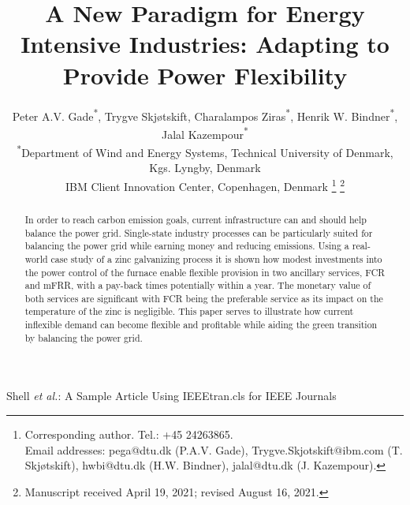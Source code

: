 \documentclass[lettersize,journal]{IEEEtran}
\begin{document}
\title{A New Paradigm for Energy Intensive Industries: Adapting to Provide Power Flexibility}

\author{Peter A.V. Gade\textsuperscript{*}\textsuperscript{\textdagger}, Trygve Skjøtskift\textsuperscript{\textdagger}, Charalampos Ziras\textsuperscript{*}, Henrik W. Bindner\textsuperscript{*}, Jalal Kazempour\textsuperscript{*} \\
    \textsuperscript{*}Department of Wind and Energy Systems, Technical University of Denmark, Kgs. Lyngby, Denmark \\
    \textsuperscript{\textdagger}IBM Client Innovation Center, Copenhagen, Denmark
    \thanks{Corresponding author. Tel.: +45 24263865. \\ Email addresses: pega@dtu.dk (P.A.V. Gade), Trygve.Skjotskift@ibm.com (T. Skjøtskift), hwbi@dtu.dk (H.W. Bindner), jalal@dtu.dk (J. Kazempour).}%
    \thanks{Manuscript received April 19, 2021; revised August 16, 2021.}}


%
{Shell \MakeLowercase{\textit{et al.}}: A Sample Article Using IEEEtran.cls for IEEE Journals}


\maketitle


\begin{abstract}
    In order to reach carbon emission goals, current infrastructure can and should help balance the power grid. Single-state industry processes can be particularly suited for balancing the power grid while earning money and reducing emissions. Using a real-world case study of a zinc galvanizing process it is shown how modest investments into the power control of the furnace enable flexible provision in two ancillary services, FCR and mFRR, with a pay-back times potentially within a year. The monetary value of both services are significant with FCR being the preferable service as its impact on the temperature of the zinc is negligible. This paper serves to illustrate how current inflexible demand can become flexible and profitable while aiding the green transition by balancing the power grid.
\end{abstract}
\end{document}
